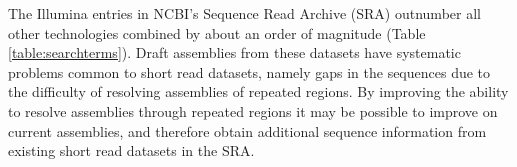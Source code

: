 \documentclass[10pt]{article}
\makeatletter
\newcommand{\cmidrules}[1]{%
  \noalign{%
    \global\MD@cmidrules={}%
    \toks@={\cmidrule(l{.3\tabcolsep}r{.3\tabcolsep})}%
    \count@=\z@
    \loop\ifnum\count@<#1\relax
      \advance\count@\@ne
      \edef\MD@temp{\the\toks@{\the\count@-\the\count@}}%
      \global\MD@cmidrules\expandafter{\the\expandafter\MD@cmidrules\MD@temp}%
    \repeat
  }%
  \the\MD@cmidrules
}
\makeatother
\begin{document}
\begin{linenumbers}
\begin{table}[!h]
\end{table}



The Illumina entries in NCBI's Sequence Read Archive (SRA) \cite{Kodama2012a} outnumber all other technologies combined by about an order of magnitude (Table \ref{table:searchterms}). Draft assemblies from these datasets have systematic problems common to short read datasets, namely gaps in the sequences due to the difficulty of resolving assemblies of repeated regions\cite{Whiteford2005,Treangen2011}. By improving the ability to resolve assemblies through repeated regions  it may be possible to improve on current assemblies, and therefore obtain additional sequence information from existing short read datasets in the SRA.




\end{linenumbers}
\end{document}
